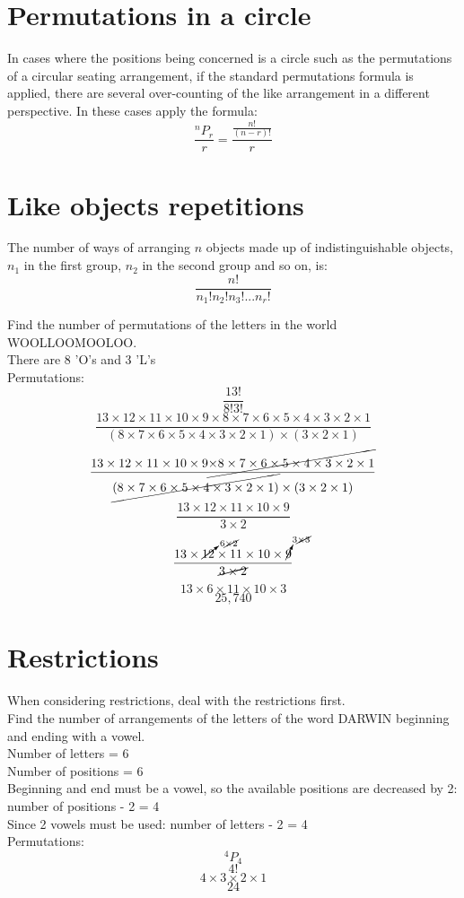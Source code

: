 \documentclass{book}
\newcommand{\Perm}[2]{{}^#1P_{#2}}
\begin{document}
\section{Permutations in a circle}
In cases where the positions being concerned is a circle such as the permutations of a circular seating arrangement, if the standard permutations formula is applied, there are several over-counting of the like arrangement in a different perspective.  In these cases apply the formula:
\[
	\frac{^nP_r}{r} = \frac{\frac{n!}{(n-r)!}}{r}
\]

\section{Like objects repetitions}
The number of ways of arranging $n$ objects made up of indistinguishable objects, $n_1$ in the first group, $n_2$ in the second group and so on, is:
\[
	\frac{n!}{n_1! n_2! n_3!... n_r!}
\]

Find the number of permutations of the letters in the world WOOLLOOMOOLOO.\\
There are 8 'O's and 3 'L's\\
Permutations:
\[\frac{13!}{8!3!}\]
\[\frac{13 \times 12 \times 11 \times 10 \times 9 \times 8 \times 7 \times 6 \times 5 \times 4 \times 3 \times 2 \times 1}{(8 \times 7 \times 6 \times 5 \times 4 \times 3 \times 2 \times 1) \times (3 \times 2 \times 1)}\]
\[\frac{13 \times 12 \times 11 \times 10 \times 9 \cancel{\times 8 \times 7 \times 6 \times 5 \times 4 \times 3 \times 2 \times 1}}{\cancel{(8 \times 7 \times 6 \times 5 \times 4 \times 3 \times 2 \times 1)} \times (3 \times 2 \times 1)}\]
\[\frac{13 \times 12 \times 11 \times 10 \times 9}{3 \times 2}\]
\[\frac{13 \times \cancelto{6 \cancel{\times 2}}{12} \times 11 \times 10 \times \cancelto{3 \cancel{\times 3}}{9}}{\cancel{3 \times 2}}\]
\[13 \times 6 \times 11 \times 10 \times 3\]
\[25,740\]

\section{Restrictions}
When considering restrictions, deal with the restrictions first.\\

Find the number of arrangements of the letters of the word DARWIN beginning and ending with a vowel.\\
Number of letters = 6\\
Number of positions = 6\\
Beginning and end must be a vowel, so the available positions are decreased by 2: number of positions - 2 = 4\\
Since 2 vowels must be used:  number of letters - 2 = 4\\
Permutations:
\[\Perm{4}{4}\]
\[4!\]
\[4 \times 3 \times 2 \times 1\]
\[24\]
\end{document}
